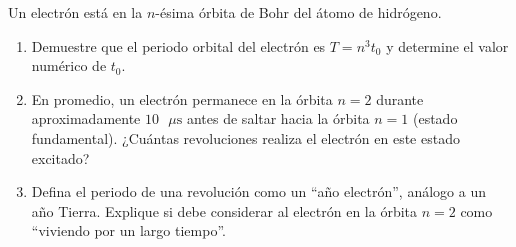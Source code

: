 \item Un electrón está en la $n$-ésima órbita de Bohr del átomo de hidrógeno.
\begin{enumerate}
    \item Demuestre que el periodo orbital del electrón es $T = n^3 t_0$ y determine el valor numérico de $t_0$.
    \item En promedio, un electrón permanece en la órbita $n = 2$ durante aproximadamente $10\text{ }\mu\text{s}$ antes de saltar hacia la órbita $n = 1$ (estado fundamental). ¿Cuántas revoluciones realiza el electrón en este estado excitado?
    \item Defina el periodo de una revolución como un ``año electrón'', análogo a un año Tierra. Explique si debe considerar al electrón en la órbita $n = 2$ como ``viviendo por un largo tiempo''.
\end{enumerate}